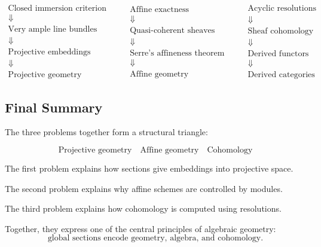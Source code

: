 \documentclass[12pt,a4paper]{article}
\theoremstyle{notespace}
\begin{document}
\[
\begin{array}{c}
	\text{Closed immersion criterion}
	\\
	\Downarrow
	\\
	\text{Very ample line bundles}
	\\
	\Downarrow
	\\
	\text{Projective embeddings}
	\\
	\Downarrow
	\\
	\text{Projective geometry}
\end{array}
\qquad
\begin{array}{c}
	\text{Affine exactness}
	\\
	\Downarrow
	\\
	\text{Quasi-coherent sheaves}
	\\
	\Downarrow
	\\
	\text{Serre's affineness theorem}
	\\
	\Downarrow
	\\
	\text{Affine geometry}
\end{array}
\qquad
\begin{array}{c}
	\text{Acyclic resolutions}
	\\
	\Downarrow
	\\
	\text{Sheaf cohomology}
	\\
	\Downarrow
	\\
	\text{Derived functors}
	\\
	\Downarrow
	\\
	\text{Derived categories}
\end{array}
\]

\subsection{Final Summary}

The three problems together form a structural triangle:

\[
\boxed{
	\text{Projective geometry}
	\quad
	\text{Affine geometry}
	\quad
	\text{Cohomology}
}
\]

The first problem explains how sections give embeddings into projective space.

The second problem explains why affine schemes are controlled by modules.

The third problem explains how cohomology is computed using resolutions.

Together, they express one of the central principles of algebraic geometry:
\[
\boxed{
	\text{global sections encode geometry, algebra, and cohomology.}
}
\]
\end{document}
